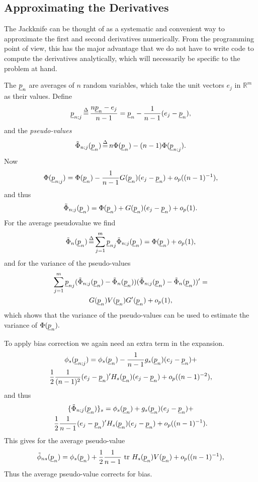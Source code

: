 \documentclass{amsart}
\theoremstyle{definition}
\theoremstyle{remark}
\numberwithin{equation}{section}
\begin{document}
\subsection{Approximating the Derivatives}
%
The Jackknife can be thought of as a systematic and convenient way to
approximate the first and second derivatives numerically. From the
programming point of view, this has the major advantage that we
do not have to write code to compute the derivatives analytically, 
which will
necessarily be specific to the problem at hand.\par
%
The $\underline p_n$ are averages of $n$ random variables, which take the
unit vectors $e_j$ in $\mathbb{R}^m$ as their values. Define
\begin{equation}
\underline p_{n;j}\mathop{=}\limits^{\Delta}\frac{n\underline p_n-e_j}{n-1}=\underline p_n-\frac{1}{n-1}(e_j-\underline p_n),
\end{equation}
and the \emph{pseudo-values}
\begin{equation}
\tilde\Phi_{n;j}(\underline p_n)\mathop{=}\limits^{\Delta} n\Phi(\underline p_n)-(n-1)\Phi(\underline p_{n;j}).
\end{equation}
%
Now 
\begin{equation}
\Phi(\underline p_{n;j})=\Phi(\underline p_n)-\frac{1}{n-1}G(\underline p_n)(e_j-\underline p_n)+o_p((n-1)^{-1}),
\end{equation}
and thus
\begin{equation}
\tilde\Phi_{n;j}(\underline p_n)=\Phi(\underline p_n)+G(\underline p_n)(e_j-\underline p_n)+o_p(1).
\end{equation}
For the average pseudovalue we find
\begin{equation}
\tilde\Phi_n(\underline p_n)\mathop{=}\limits^{\Delta}\sum_{j=1}^m \underline p_{nj}\tilde\Phi_{n;j}(\underline p_n)=
\Phi(\underline p_n)+o_p(1),
\end{equation}
and for the variance of the pseudo-values
\begin{multline}
\sum_{j=1}^m \underline p_{nj}
(\tilde\Phi_{n;j}(\underline p_n)-\tilde\Phi_n(\underline p_n))
(\tilde\Phi_{n;j}(\underline p_n)-\tilde\Phi_n(\underline p_n))'=\\
G(\underline p_n)V(\underline p_n)G'(\underline p_n)+o_p(1),
\end{multline}
which shows that the variance of the pseudo-values can be used to
estimate the variance of $\Phi(\underline p_n).$ \par
%
To apply bias correction we again need an extra term in the
expansion.
%
\begin{multline}
\phi_s(\underline p_{n;j})=\phi_s(\underline p_n)-
\frac{1}{n-1}g_s(\underline p_n)(e_j-\underline p_n)+\\
\frac{1}{2}\frac{1}{(n-1)^2}(e_j-\underline p_n)'H_s(\underline p_n)(e_j-\underline p_n)+o_p((n-1)^{-2}),
\end{multline}
%
and thus
%
\begin{multline}
\{\tilde\Phi_{n;j}(\underline p_n)\}_s=\phi_s(\underline p_n)+g_s(\underline p_n)(e_j-\underline p_n)+\\
\frac{1}{2}\frac{1}{n-1}(e_j-\underline p_n)'H_s(\underline p_n)(e_j-\underline p_n)+o_p((n-1)^{-1}).
\end{multline}
%
This gives for the average pseudo-value
\begin{equation}
\tilde\phi_{ns}(\underline p_n)=\phi_s(\underline p_n)+\frac{1}{2}\frac{1}{n-1}
\text{ tr }H_s(\underline p_n)V(\underline p_n)+o_p((n-1)^{-1}),
\end{equation}
Thus the average pseudo-value corrects for bias.
%
\end{document}
